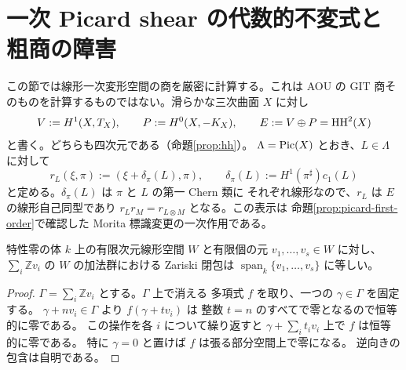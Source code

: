 \section{一次 Picard shear の代数的不変式と粗商の障害}
\label{sec:picard-invariant-quotient}

この節では線形一次変形空間の商を厳密に計算する。これは AOU の
GIT 商そのものを計算するものではない。滑らかな三次曲面 $X$ に対し
\[
 V:=H^1(X,T_X),\qquad P:=H^0(X,-K_X),\qquad
 E:=V\oplus P=\operatorname{HH}^2(X)
\]
と書く。どちらも四次元である（命題\ref{prop:hh}）。
$\Lambda=\operatorname{Pic}(X)$ とおき、$L\in\Lambda$ に対して
\begin{equation}\label{eq:picard-linear-shear}
 r_L(\xi,\pi):=(\xi+\delta_\pi(L),\pi),\qquad
 \delta_\pi(L):=H^1(\pi^\sharp)c_1(L)
\end{equation}
と定める。$\delta_\pi(L)$ は $\pi$ と $L$ の第一 Chern 類に
それぞれ線形なので、$r_L$ は $E$ の線形自己同型であり
$r_Lr_M=r_{L\otimes M}$ となる。この表示は
命題\ref{prop:picard-first-order}で確認した Morita 標識変更の一次作用である。

\begin{lemma}
\label{lem:translation-closure}
特性零の体 $k$ 上の有限次元線形空間 $W$ と有限個の元
$v_1,\ldots,v_s\in W$ に対し、$\sum_i\mathbb Z v_i$ の
$W$ の加法群における Zariski 閉包は
$\operatorname{span}_k\{v_1,\ldots,v_s\}$ に等しい。
\end{lemma}
\begin{proof}
$\Gamma=\sum_i\mathbb Z v_i$ とする。$\Gamma$ 上で消える
多項式 $f$ を取り、一つの $\gamma\in\Gamma$ を固定する。
$\gamma+n v_i\in\Gamma$ より $f(\gamma+t v_i)$ は
整数 $t=n$ のすべてで零となるので恒等的に零である。
この操作を各 $i$ について繰り返すと
$\gamma+\sum_i t_i v_i$ 上で $f$ は恒等的に零である。
特に $\gamma=0$ と置けば $f$ は張る部分空間上で零になる。
逆向きの包含は自明である。
\end{proof}

